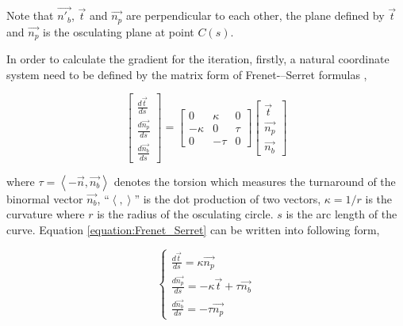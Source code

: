 Note that $\vec{n'_{b}}$, $\vec{t}$ and $\vec{n_{p}}$ are perpendicular to each other, the plane defined by $\vec{t}$ and $\vec{n_{p}}$ is the osculating plane at point $C(s)$.

In order to calculate the gradient for the iteration, firstly, a natural coordinate system need to be defined by the matrix form of Frenet-–Serret formulas ,

\begin{equation}
\begin{bmatrix}
\frac{d\vec{t}}{ds}\\
\frac{d\vec{n_{p}}}{ds}\\
\frac{d\vec{n_{b}}}{ds}
\end{bmatrix}
=
\begin{bmatrix}
0 & \kappa & 0\\
-\kappa & 0 & \tau \\
0 & -\tau & 0
\end{bmatrix}
\begin{bmatrix}
\vec{t}\\
\vec{n_{p}}\\
\vec{n_{b}}
\end{bmatrix}
\label{equation:Frenet_Serret}
\end{equation}

where $\tau = \left \langle -\vec{n},\vec{n_b}\right \rangle$ denotes the torsion which measures the turnaround of the binormal vector $\vec{n_{b}}$, ``$\left \langle , \right \rangle$'' is the dot production of two vectors,
 $\kappa = 1/r $ is the curvature where $r$ is the radius of the osculating circle. $s$ is the arc length of the curve. Equation \ref{equation:Frenet_Serret} can be written into following form,

\begin{equation}
\left\{\begin{matrix}
\frac{d\vec{t}}{ds} = \kappa \vec{n_{p}}\\ 
\frac{d\vec{n_{p}}}{ds} = -\kappa \vec{t} + \tau \vec{n_{b}}\\ 
\frac{d\vec{n_{b}}}{ds} = -\tau \vec{n_{p}}
\end{matrix}\right.
\label{equation:Frenet_Serret2}
\end{equation}


%

